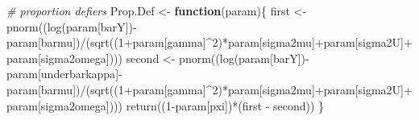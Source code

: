 \documentclass[
]{book}
\newenvironment{Shaded}{\begin{snugshade}}{\end{snugshade}}
\newcommand{\CommentTok}[1]{\textcolor[rgb]{0.56,0.35,0.01}{\textit{#1}}}
\newcommand{\ControlFlowTok}[1]{\textcolor[rgb]{0.13,0.29,0.53}{\textbf{#1}}}
\newcommand{\DecValTok}[1]{\textcolor[rgb]{0.00,0.00,0.81}{#1}}
\newcommand{\FunctionTok}[1]{\textcolor[rgb]{0.00,0.00,0.00}{#1}}
\newcommand{\NormalTok}[1]{#1}
\newcommand{\OtherTok}[1]{\textcolor[rgb]{0.56,0.35,0.01}{#1}}
\newcommand{\SpecialCharTok}[1]{\textcolor[rgb]{0.00,0.00,0.00}{#1}}
\newcommand{\StringTok}[1]{\textcolor[rgb]{0.31,0.60,0.02}{#1}}
\theoremstyle{definition}
\theoremstyle{definition}
\theoremstyle{definition}
\theoremstyle{definition}
\theoremstyle{remark}
\begin{document}
\begin{Shaded}
\begin{Highlighting}[]
\CommentTok{\# proportion defiers}
\NormalTok{Prop.Def }\OtherTok{\textless{}{-}} \ControlFlowTok{function}\NormalTok{(param)\{}
\NormalTok{  first }\OtherTok{\textless{}{-}} \FunctionTok{pnorm}\NormalTok{((}\FunctionTok{log}\NormalTok{(param[}\StringTok{\textquotesingle{}barY\textquotesingle{}}\NormalTok{])}\SpecialCharTok{{-}}\NormalTok{param[}\StringTok{\textquotesingle{}barmu\textquotesingle{}}\NormalTok{])}\SpecialCharTok{/}\NormalTok{(}\FunctionTok{sqrt}\NormalTok{((}\DecValTok{1}\SpecialCharTok{+}\NormalTok{param[}\StringTok{\textquotesingle{}gamma\textquotesingle{}}\NormalTok{]}\SpecialCharTok{\^{}}\DecValTok{2}\NormalTok{)}\SpecialCharTok{*}\NormalTok{param[}\StringTok{\textquotesingle{}sigma2mu\textquotesingle{}}\NormalTok{]}\SpecialCharTok{+}\NormalTok{param[}\StringTok{\textquotesingle{}sigma2U\textquotesingle{}}\NormalTok{]}\SpecialCharTok{+}\NormalTok{param[}\StringTok{\textquotesingle{}sigma2omega\textquotesingle{}}\NormalTok{])))}
\NormalTok{  second }\OtherTok{\textless{}{-}} \FunctionTok{pnorm}\NormalTok{((}\FunctionTok{log}\NormalTok{(param[}\StringTok{\textquotesingle{}barY\textquotesingle{}}\NormalTok{])}\SpecialCharTok{{-}}\NormalTok{param[}\StringTok{\textquotesingle{}underbarkappa\textquotesingle{}}\NormalTok{]}\SpecialCharTok{{-}}\NormalTok{param[}\StringTok{\textquotesingle{}barmu\textquotesingle{}}\NormalTok{])}\SpecialCharTok{/}\NormalTok{(}\FunctionTok{sqrt}\NormalTok{((}\DecValTok{1}\SpecialCharTok{+}\NormalTok{param[}\StringTok{\textquotesingle{}gamma\textquotesingle{}}\NormalTok{]}\SpecialCharTok{\^{}}\DecValTok{2}\NormalTok{)}\SpecialCharTok{*}\NormalTok{param[}\StringTok{\textquotesingle{}sigma2mu\textquotesingle{}}\NormalTok{]}\SpecialCharTok{+}\NormalTok{param[}\StringTok{\textquotesingle{}sigma2U\textquotesingle{}}\NormalTok{]}\SpecialCharTok{+}\NormalTok{param[}\StringTok{\textquotesingle{}sigma2omega\textquotesingle{}}\NormalTok{])))}
  \FunctionTok{return}\NormalTok{((}\DecValTok{1}\SpecialCharTok{{-}}\NormalTok{param[}\StringTok{\textquotesingle{}pxi\textquotesingle{}}\NormalTok{])}\SpecialCharTok{*}\NormalTok{(first }\SpecialCharTok{{-}}\NormalTok{ second))  }
\NormalTok{\}}
\end{Highlighting}
\end{Shaded}
\end{document}
